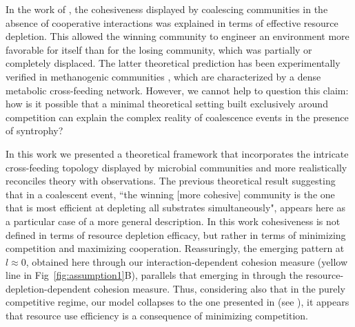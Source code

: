 \documentclass[10pt,letterpaper]{article}
\begin{document}
In the work of \cite{Tikhonov2016}, the cohesiveness displayed by coalescing communities in the absence of cooperative interactions was explained in terms of effective resource depletion. This allowed the winning community to engineer an environment more favorable for itself than for the losing community, which was partially or completely displaced. The latter theoretical prediction has been experimentally verified in methanogenic communities \cite{Sierocinski2017}, which are characterized by a dense metabolic cross-feeding network. However, we cannot help to question this claim: how is it possible that a minimal theoretical setting built exclusively around competition can explain the complex reality of coalescence events in the presence of syntrophy?

In this work we presented a theoretical framework that incorporates the intricate cross-feeding topology displayed by microbial communities and more realistically reconciles theory with observations. The previous theoretical result suggesting that in a coalescent event, ``the winning [more cohesive] community is the one that is most efficient at depleting all substrates simultaneously", appears here as a particular case of a more general description. In this work cohesiveness is not defined in terms of resource depletion efficacy, but rather in terms of minimizing competition and maximizing cooperation. Reassuringly, the emerging pattern at $l\approx0$, obtained here through our interaction-dependent cohesion measure (yellow line in Fig~\ref{fig:assumption1}B), parallels that emerging in  \cite{Tikhonov2016} through the resource-depletion-dependent cohesion measure. Thus, considering also that in the purely competitive regime, our model collapses  to the one presented in \cite{Tikhonov2016} (see ), it appears that resource use efficiency is a consequence of minimizing competition.

\end{document}

